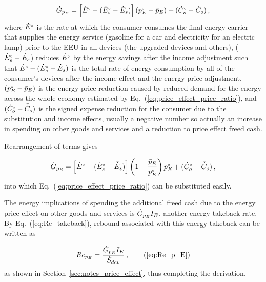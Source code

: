 \begin{equation}
  \dot{G}_{p_E} = \left[ {}{\dot{E}}^{\scriptscriptstyle \circ} - ({}{\dot{E}}^{\scriptscriptstyle \circ}_s - \bar{\dot{E}}_s) \right] ({}{p}^{\scriptscriptstyle \circ}_E - \bar{p}_E) + ({}{\dot{C}}^{\scriptscriptstyle \circ}_o - \bar{\dot{C}}_o) \, ,
\end{equation}
%
where ${}{\dot{E}}^{\scriptscriptstyle \circ}$ is the rate at which the consumer 
consumes the final energy carrier that supplies
the energy service
(gasoline for a car and
electricity for an electric lamp) 
prior to the EEU
in all devices (the upgraded devices and others), 
(${}{\dot{E}}^{\scriptscriptstyle \circ}_s - \bar{\dot{E}}_s$) reduces 
${}{\dot{E}}^{\scriptscriptstyle \circ}$ by the energy savings after the income adjustment
such that
${}{\dot{E}}^{\scriptscriptstyle \circ} - ({}{\dot{E}}^{\scriptscriptstyle \circ}_s - \bar{\dot{E}}_s)$
is the total rate of energy consumption by all of the 
consumer's devices
after the income effect and the energy price adjustment,
$({}{p}^{\scriptscriptstyle \circ}_E - \bar{p}_E)$ is the energy price reduction
caused by reduced demand for the energy across 
the whole economy estimated by 
Eq.~(\ref{eq:price_effect_price_ratio}), 
and 
$({}{\dot{C}}^{\scriptscriptstyle \circ}_o - \bar{\dot{C}}_o)$ is the 
signed expense reduction for the consumer
due to the substitution and income effects,
usually a negative number
so actually an increase in spending on other goods and services 
and a reduction to price effect freed cash.

Rearrangement of terms gives

\begin{equation}
  \dot{G}_{p_E} = \left[ {}{\dot{E}}^{\scriptscriptstyle \circ} - ({}{\dot{E}}^{\scriptscriptstyle \circ}_s - \bar{\dot{E}}_s) \right] \left( 1 - \frac{\bar{p}_E}{{}{p}^{\scriptscriptstyle \circ}_E} \right) {}{p}^{\scriptscriptstyle \circ}_E + ({}{\dot{C}}^{\scriptscriptstyle \circ}_o - \bar{\dot{C}}_o) \, ,
\end{equation}
%
into which Eq.~(\ref{eq:price_effect_price_ratio})
can be substituted easily.

The energy implications of spending the additional freed cash
due to the energy price effect
on other goods and services is
$\dot{G}_{p_E} I_E$,
another energy takeback rate.
By Eq.~(\ref{eq:Re_takeback}),
rebound associated with this energy takeback
can be written as

\begin{equation}
  Re_{p_E} = \frac{\rate{G}_{p_E} I_E}{\Sdot} \, , \tag{\ref{eq:Re_p_E}}
\end{equation}
%
as shown in Section~\ref{sec:notes_price_effect},
thus completing the derivation.



